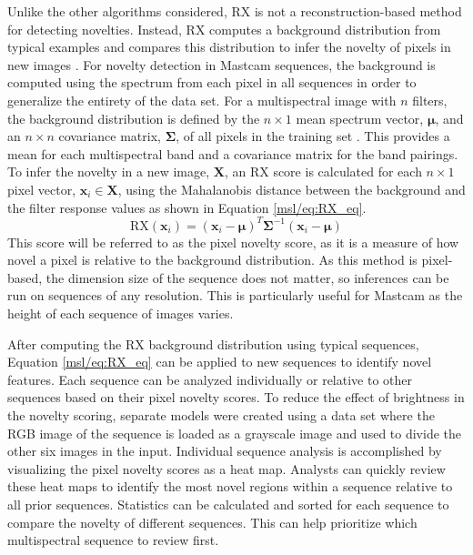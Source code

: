 Unlike the other algorithms considered, RX is not a reconstruction-based method for detecting novelties.
Instead, RX computes a background distribution from typical examples and compares this distribution to infer the novelty of pixels in new images \parencite{reed1990adaptive}.
For novelty detection in Mastcam sequences, the background is computed using the spectrum from each pixel in all sequences in order to generalize the entirety of the data set. 
For a multispectral image with $n$ filters, the background distribution is defined by the $n \times 1$ mean spectrum vector, $\boldsymbol{\mu}$, and an $n \times n$ covariance matrix, $\boldsymbol{\Sigma}$, of all pixels in the training set \parencite{guo2016anomaly}.
This provides a mean for each multispectral band and a covariance matrix for the band pairings. 
To infer the novelty in a new image, $\boldsymbol{X}$, an RX score is calculated for each $n \times 1$ pixel vector, $\boldsymbol{x}_i \in \boldsymbol{X}$, using the Mahalanobis distance between the background and the filter response values as shown in Equation \ref{msl/eq:RX_eq}.
\begin{equation}
    \label{msl/eq:RX_eq}
    \text{RX}(\boldsymbol{x}_i) = (\boldsymbol{x}_i - \boldsymbol{\mu})^T \boldsymbol{\Sigma}^{-1} (\boldsymbol{x}_i - \boldsymbol{\mu})
\end{equation}
This score will be referred to as the pixel novelty score, as it is a measure of how novel a pixel is relative to the background distribution. 
As this method is pixel-based, the dimension size of the sequence does not matter, so inferences can be run on sequences of any resolution.
This is particularly useful for Mastcam as the height of each sequence of images varies. 

After computing the RX background distribution using typical sequences, Equation \ref{msl/eq:RX_eq} can be applied to new sequences to identify novel features.
Each sequence can be analyzed individually or relative to other sequences based on their pixel novelty scores. 
To reduce the effect of brightness in the novelty scoring, separate models were created using a data set where the RGB image of the sequence is loaded as a grayscale image and used to divide the other six images in the input. 
Individual sequence analysis is accomplished by visualizing the pixel novelty scores as a heat map. 
Analysts can quickly review these heat maps to identify the most novel regions within a sequence relative to all prior sequences. 
Statistics can be calculated and sorted for each sequence to compare the novelty of different sequences.
This can help prioritize which multispectral sequence to review first. 

